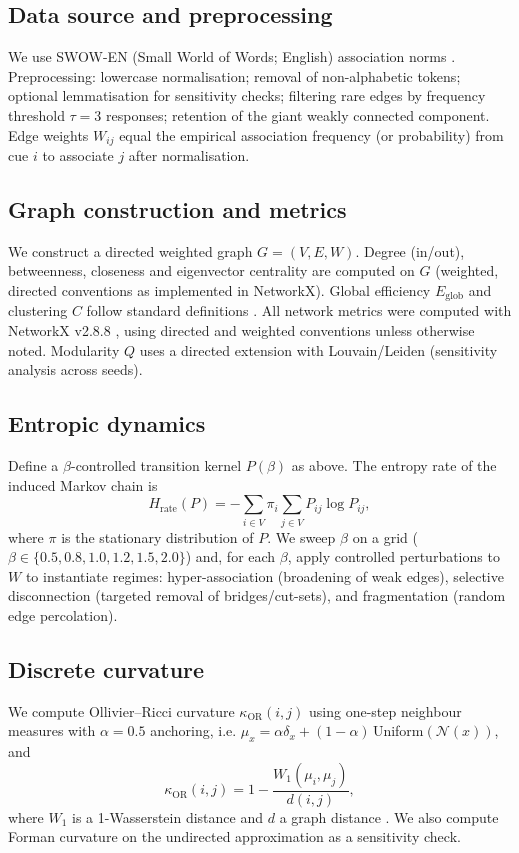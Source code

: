 \documentclass[fleqn,10pt]{wlscirep}
\begin{document}
\subsection*{Data source and preprocessing}
We use SWOW-EN (Small World of Words; English) association norms \cite{DeDeyne2019}. Preprocessing: lowercase normalisation; removal of non-alphabetic tokens; optional lemmatisation for sensitivity checks; filtering rare edges by frequency threshold $\tau=3$ responses; retention of the giant weakly connected component. Edge weights $W_{ij}$ equal the empirical association frequency (or probability) from cue $i$ to associate $j$ after normalisation.

\subsection*{Graph construction and metrics}
We construct a directed weighted graph $G=(V,E,W)$. Degree (in/out), betweenness, closeness and eigenvector centrality are computed on $G$ (weighted, directed conventions as implemented in NetworkX). Global efficiency $E_{\mathrm{glob}}$ and clustering $C$ follow standard definitions \cite{Newman2010Networks,Latora2001PRL}. All network metrics were computed with NetworkX v2.8.8 \cite{NetworkX}, using directed and weighted conventions unless otherwise noted. Modularity $Q$ uses a directed extension with Louvain/Leiden (sensitivity analysis across seeds).

\subsection*{Entropic dynamics}
Define a $\beta$-controlled transition kernel $P(\beta)$ as above. The entropy rate of the induced Markov chain is
\begin{equation}
H_{\mathrm{rate}}(P) = - \sum_{i\in V} \pi_i \sum_{j\in V} P_{ij} \log P_{ij},
\end{equation}
where $\pi$ is the stationary distribution of $P$. We sweep $\beta$ on a grid ($\beta\in\{0.5,0.8,1.0,1.2,1.5,2.0\}$) and, for each $\beta$, apply controlled perturbations to $W$ to instantiate regimes: hyper-association (broadening of weak edges), selective disconnection (targeted removal of bridges/cut-sets), and fragmentation (random edge percolation).

\subsection*{Discrete curvature}
We compute Ollivier--Ricci curvature $\kappa_{\mathrm{OR}}(i,j)$ using one-step neighbour measures with $\alpha=0.5$ anchoring, i.e. $\mu_x=\alpha\delta_x+(1-\alpha)\,$Uniform$(\mathcal{N}(x))$, and
\begin{equation}
\kappa_{\mathrm{OR}}(i,j) = 1 - \frac{W_1(\mu_i,\mu_j)}{d(i,j)},
\end{equation}
where $W_1$ is a 1-Wasserstein distance and $d$ a graph distance \cite{Ollivier2009,Forman2003}. We also compute Forman curvature on the undirected approximation as a sensitivity check.
\end{document}
